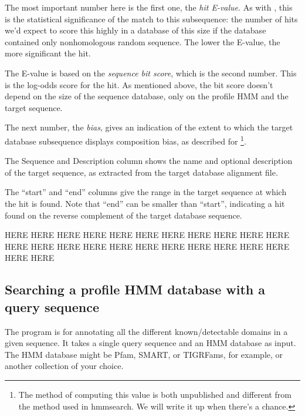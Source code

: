 The most important number here is the first one, the \emph{hit E-value}. As
with , this is the statistical significance of the match to
this subsequence: the number of hits we'd expect to score this highly in a
database of this size if the database contained only nonhomologous random
sequence. The lower the E-value, the more significant the hit.

The E-value is based on the \emph{sequence bit score}, which is the second
number. This is the log-odds score for the hit. As mentioned above, the bit
score doesn't depend on the size of the sequence database, only on the profile
HMM and the target sequence.

The next number, the \emph{bias}, gives an indication of the extent to which
the target database subsequence displays composition bias, as
described for \footnote{The method of computing this value is
both unpublished and different from the method used in hmmsearch. We will write
it up when there's a chance.}.

The Sequence and Description column shows the name and optional description of
the target sequence, as extracted from the target database alignment file.

The ``start'' and ``end'' columns give the range in the target sequence at which
the hit is found. Note that ``end'' can be smaller than ``start'', indicating a
hit found on the reverse complement of the target database sequence.







HERE  HERE  HERE  HERE  HERE  HERE  HERE  HERE  HERE  HERE  HERE  HERE  HERE HERE  HERE  HERE  HERE  HERE  HERE  HERE  HERE  HERE  HERE  HERE














\subsection{Searching a profile HMM database with a query sequence}

The  program is for annotating all the different
known/detectable domains in a given sequence. It takes a single query
sequence and an HMM database as input. The HMM database might be Pfam,
SMART, or TIGRFams, for example, or another collection of your choice.

